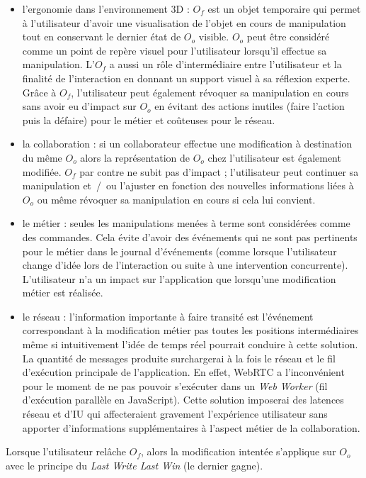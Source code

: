 \begin{itemize}
	\item l'ergonomie dans l'environnement \gls{3D} :
	$O_f$ est un objet temporaire qui permet à l'utilisateur
	d'avoir une visualisation de l'objet en cours de manipulation tout en 
	conservant le dernier état de $O_o$ visible. 
	$O_o$ peut être considéré comme un point de repère visuel pour l'utilisateur 
	lorsqu'il effectue sa manipulation. 
	L'$O_f$ a aussi un rôle d'intermédiaire entre l'utilisateur et la 
	finalité de l'interaction en donnant un support visuel à sa réflexion experte.
	Grâce à $O_f$, l'utilisateur peut également révoquer sa manipulation en 
	cours sans avoir eu d'impact sur $O_o$ en évitant des actions inutiles (faire l'action 
	puis la défaire) pour le métier et coûteuses pour le réseau.
	
	\item la collaboration : si un collaborateur effectue une modification 
	à destination du même $O_o$ alors la représentation de $O_o$ chez 
	l'utilisateur est également modifiée. $O_f$ par contre ne subit pas d'impact ; 
	l'utilisateur peut continuer sa manipulation et~/~ou l'ajuster en fonction des 
	nouvelles informations liées à $O_o$ ou même révoquer sa manipulation 
	en cours si cela lui convient.

	\item le métier : seules les manipulations menées à terme sont 
	considérées comme des commandes. Cela évite d'avoir des événements qui ne 
	sont pas pertinents pour le métier dans le journal d'événements (comme lorsque 
	l'utilisateur change d'idée lors de l'interaction ou
	suite à une intervention concurrente). L'utilisateur n'a un impact sur l'application 
	que lorsqu'une modification métier est réalisée.
	
	\item le réseau : l'information importante à faire transité est l'événement 
	correspondant à la modification métier pas toutes les positions intermédiaires 
	même si intuitivement l'idée de temps réel pourrait conduire à cette solution. La 
	quantité de messages produite surchargerai à la fois le réseau et le fil 
	d'exécution principale de l'application. En effet, \gls{WebRTC} a l'inconvénient pour le 
	moment de ne pas pouvoir s'exécuter dans un \textit{Web Worker} (fil d'exécution 
	parallèle en JavaScript). Cette solution imposerai des 
	latences réseau et d'\gls{IU} qui affecteraient gravement l'expérience utilisateur
	sans apporter d'informations supplémentaires à l'aspect métier de la 
	collaboration. 
\end{itemize}

Lorsque l'utilisateur relâche $O_f$, alors la modification intentée s'applique sur 
$O_o$ avec le principe du \textit{Last Write Last Win} (le dernier gagne).